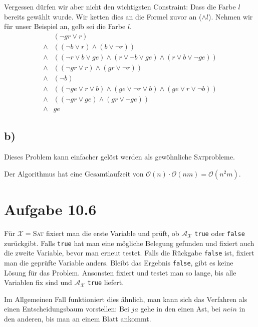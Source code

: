 \documentclass{article}
\begin{document}
Vergessen dürfen wir aber nicht den wichtigsten Constraint: Dass die Farbe $l$ bereits gewählt wurde. Wir ketten dies an die Formel zuvor an ($\wedge l$). Nehmen wir für unser Beispiel an, gelb sei die Farbe $l$.
\begin{align*}
       &\left(\neg gr \vee r \right) \\
\wedge &\left( \left( \neg b \vee r \right) \wedge \left( b \vee \neg r \right) \right) \\
\wedge &\left( \left(\neg r \vee b \vee ge \right) \wedge \left(r \vee \neg b \vee ge \right) \wedge \left(r \vee b \vee \neg ge \right) \right) \\
\wedge &\left( \left( \neg gr \vee r \right) \wedge \left( gr \vee \neg r \right) \right) \\
\wedge &\left( \neg b \right) \\
\wedge &\left( \left(\neg ge \vee r \vee b \right) \wedge \left(ge \vee \neg r \vee b \right) \wedge \left(ge \vee r \vee \neg b \right) \right) \\
\wedge &\left( \left( \neg gr \vee ge \right) \wedge \left( gr \vee \neg ge \right) \right) \\
\wedge & ge
\end{align*}


\subsection*{b)}
Dieses Problem kann einfacher gelöst werden als gewöhnliche \textsc{Sat}probleme.
\begin{algorithm}[h]
 
\end{algorithm}
Der Algorithmus hat eine Gesamtlaufzeit von $\mathcal{O}(n) \cdot \mathcal{O}(nm) = \mathcal{O}(n^2m)$.



\section*{Aufgabe 10.6}
Für $\mathcal{X}=$\textsc{Sat} fixiert man die erste Variable und prüft, ob $\mathcal{A_X}$ \texttt{true} oder \texttt{false} zurückgibt. Falls \texttt{true} hat man eine mögliche Belegung gefunden und fixiert auch die zweite Variable, bevor man erneut testet. Falls die Rückgabe \texttt{false} ist, fixiert man die geprüfte Variable anders. Bleibt das Ergebnis \texttt{false}, gibt es keine Lösung für das Problem. Ansonsten fixiert und testet man so lange, bis alle Variablen fix sind und $\mathcal{A_X}$ \texttt{true} liefert.

Im Allgemeinen Fall funktioniert dies ähnlich, man kann sich das Verfahren als einen Entscheidungsbaum vorstellen: Bei $ja$ gehe in den einen Ast, bei $nein$ in den anderen, bis man an einem Blatt ankommt.
\end{document}
